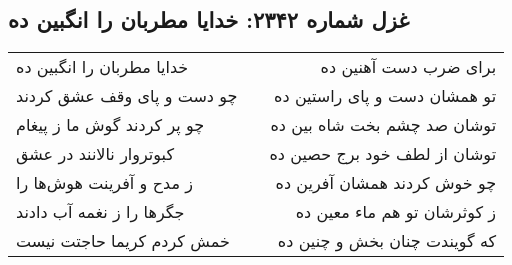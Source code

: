 \begin{center}
\section*{غزل شماره ۲۳۴۲: خدایا مطربان را انگبین ده}
\label{sec:2342}
\begin{longtable}{l p{0.5cm} r}
خدایا مطربان را انگبین ده
&&
برای ضرب دست آهنین ده
\\
چو دست و پای وقف عشق کردند
&&
تو همشان دست و پای راستین ده
\\
چو پر کردند گوش ما ز پیغام
&&
توشان صد چشم بخت شاه بین ده
\\
کبوتروار نالانند در عشق
&&
توشان از لطف خود برج حصین ده
\\
ز مدح و آفرینت هوش‌ها را
&&
چو خوش کردند همشان آفرین ده
\\
جگرها را ز نغمه آب دادند
&&
ز کوثرشان تو هم ماء معین ده
\\
خمش کردم کریما حاجتت نیست
&&
که گویندت چنان بخش و چنین ده
\\
\end{longtable}
\end{center}
